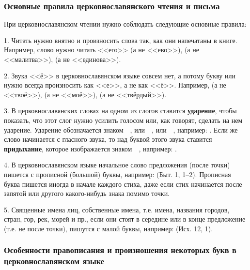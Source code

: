 \documentclass[11pt,a4paper,oneside]{memoir}
\begin{document}
        \subsubsection{Основные правила церковнославянского чтения и письма}

        При церковнославянском чтении нужно соблюдать следующие
        основные правила:

        1. Читать нужно внятно и произносить слова так, как они
        напечатаны в книге. Например, слово {} нужно
        читать <<его>> (а не <<ево>>), {} (а не
        <<малитва>>), {} (а не <<единова>>).

        2. Звука <<ё>> в церковнославянском языке совсем нет, а
        потому букву {} или {} нужно всегда произносить
        как <<е>>, а не как <<ё>>. Например, {} (а не
        <<твоё>>), {} (а не <<моё>>), {} (а
        не <<твёрдый>>).

        3. В церковнославянских словах на одном из слогов ставится
        \textbf{ударение}, чтобы показать, что этот слог нужно
        усилить голосом или, как говорят, сделать на нем ударение.
        Ударение обозначается знаком~~{}, или~~{},
        или~~{}, например: {}.
        Если же слово начинается с гласного звука, то над буквой
        этого звука ставится \textbf{придыхание}, которое
        изображается знаком~~{}, например: {}.

        4. В церковнославянском языке начальное слово предложения
        (после точки) пишется с прописной (большой) буквы, например:
        {} (Быт. 1, 1--2). Прописная буква
        пишется иногда в начале каждого стиха, даже если стих
        начинается после запятой или другого какого-нибудь знака помимо точки.

        5. Священные имена лиц, собственные имена, т.е. имена,
        названия городов, стран, гор, рек, морей и пр., если они
        стоят в середине или в конце предложение (т.е. не после
        точки), пишутся с малой буквы, например: {} (Исх. 12, 1).

        \subsubsection{Особенности правописания и произношения
        некоторых букв в церковнославянском языке}
\end{document}
